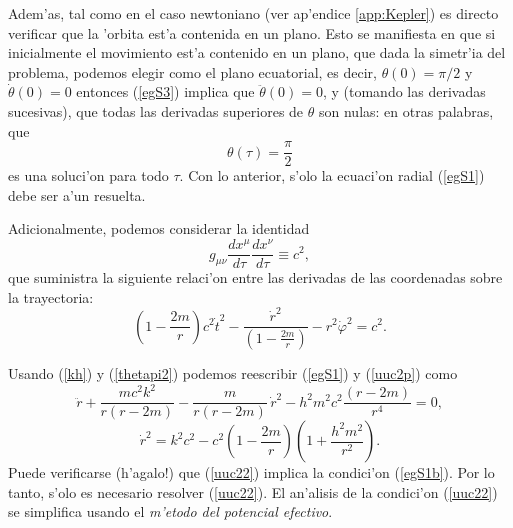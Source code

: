 Adem'as, tal como en el caso newtoniano (ver ap'endice \ref{app:Kepler}) es directo verificar que la 'orbita est'a contenida en un plano. Esto se manifiesta en que si inicialmente el movimiento est'a contenido en un plano, que dada la simetr'ia del problema, podemos elegir como el plano ecuatorial, es decir, $\theta(0)=\pi/2$ y $\dot\theta(0)=0$ entonces
(\ref{egS3}) implica que $\ddot\theta(0)=0$, y (tomando las derivadas sucesivas), que todas las derivadas superiores de $\theta$ son nulas: en otras palabras, que
\begin{equation}
\theta(\tau)=\frac{\pi}{2} \label{thetapi2}
\end{equation}
es una soluci'on para todo $\tau$. Con lo anterior, s'olo la ecuaci'on radial
(\ref{egS1}) debe ser a'un resuelta.

Adicionalmente, podemos considerar la identidad
\begin{equation}
g_{\mu\nu}\frac{dx^\mu}{d\tau}\frac{dx^\nu}{d\tau}\equiv c^2,
\end{equation}
que suministra la siguiente relaci'on entre las derivadas de las coordenadas sobre la
trayectoria:
\begin{equation}
 \left(1-\frac{2m}{r}\right)c^2\dot{t}^2
-\frac{\dot{r}^2}{\left(1-\frac{2m}{r}\right)}-r^2\dot{\varphi}^2=c^2.
\label{uuc2p}
\end{equation}


Usando (\ref{kh}) y (\ref{thetapi2}) podemos reescribir (\ref{egS1}) y
(\ref{uuc2p}) como
\begin{equation}
\ddot{r}+\frac{mc^2k^2}{r(r-2m)}-\frac{m}{r(r-2m)}\,
\dot{r}^2-h^2m^2c^2\frac{(r-2m)}{r^4} =0,
\label{egS1b}
\end{equation}
\begin{equation}
 \dot{r}^2=k^2c^2-c^2\left(1-\frac{2m}{r}\right)\left(1+\frac{h^2m^2}{r^2}
\right). \label{uuc22}
\end{equation}
Puede verificarse (h'agalo!) que (\ref{uuc22}) implica la condici'on (\ref{egS1b}). Por lo tanto, s'olo es necesario resolver (\ref{uuc22}). El an'alisis de la condici'on (\ref{uuc22}) se simplifica usando el \textit{m'etodo del potencial efectivo}.

